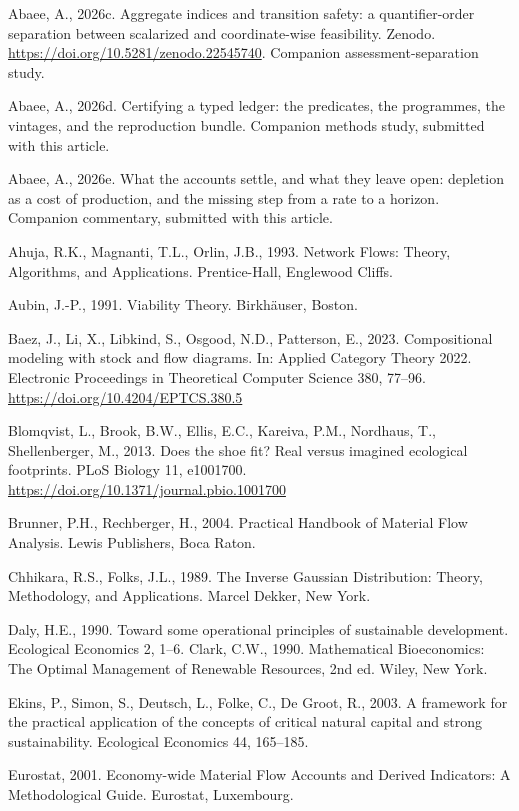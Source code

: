 \documentclass[11pt]{article}
\begin{document}
Abaee, A., 2026c. Aggregate indices and transition safety: a quantifier-order separation between scalarized and coordinate-wise feasibility. Zenodo. \url{https://doi.org/10.5281/zenodo.22545740}. Companion assessment-separation study.

Abaee, A., 2026d. Certifying a typed ledger: the predicates, the programmes, the vintages, and the reproduction bundle. Companion methods study, submitted with this article.

Abaee, A., 2026e. What the accounts settle, and what they leave open: depletion as a cost of production, and the missing step from a rate to a horizon. Companion commentary, submitted with this article.

Ahuja, R.K., Magnanti, T.L., Orlin, J.B., 1993. Network Flows: Theory, Algorithms, and Applications. Prentice-Hall, Englewood Cliffs.

Aubin, J.-P., 1991. Viability Theory. Birkh\"{a}user, Boston.

Baez, J., Li, X., Libkind, S., Osgood, N.D., Patterson, E., 2023. Compositional modeling with stock and flow diagrams. In: Applied Category Theory 2022. Electronic Proceedings in Theoretical Computer Science 380, 77--96. \url{https://doi.org/10.4204/EPTCS.380.5}

Blomqvist, L., Brook, B.W., Ellis, E.C., Kareiva, P.M., Nordhaus, T., Shellenberger, M., 2013. Does the shoe fit? Real versus imagined ecological footprints. PLoS Biology 11, e1001700. \url{https://doi.org/10.1371/journal.pbio.1001700}

Brunner, P.H., Rechberger, H., 2004. Practical Handbook of Material Flow Analysis. Lewis Publishers, Boca Raton.

Chhikara, R.S., Folks, J.L., 1989. The Inverse Gaussian Distribution: Theory, Methodology, and Applications. Marcel Dekker, New York.

Daly, H.E., 1990. Toward some operational principles of sustainable development. Ecological Economics 2, 1--6. Clark, C.W., 1990. Mathematical Bioeconomics: The Optimal Management of Renewable Resources, 2nd ed. Wiley, New York.

Ekins, P., Simon, S., Deutsch, L., Folke, C., De Groot, R., 2003. A framework for the practical application of the concepts of critical natural capital and strong sustainability. Ecological Economics 44, 165--185.

Eurostat, 2001. Economy-wide Material Flow Accounts and Derived Indicators: A Methodological Guide. Eurostat, Luxembourg.
\end{document}
